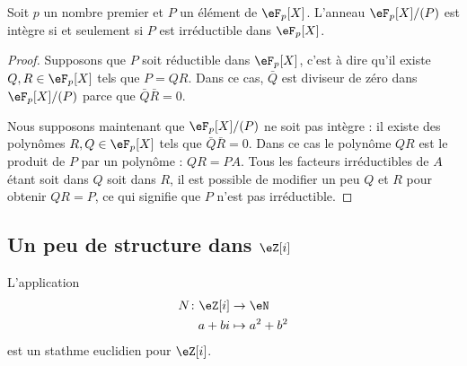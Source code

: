 \begin{proposition} \label{PropleGdaT}
    Soit \( p\) un nombre premier et \( P\) un élément de \( \eF_p[X]\). L'anneau \( \eF_p[X]/(P)\) est intègre si et seulement si \( P\) est irréductible dans \( \eF_p[X]\).
\end{proposition}

\begin{proof}
    Supposons que \( P\) soit réductible dans \( \eF_p[X]\), c'est à dire qu'il existe \( Q,R\in \eF_p[X]\) tels que \( P=QR\). Dans ce cas, \( \bar Q\) est diviseur de zéro dans \( \eF_p[X]/(P)\) parce que \( \bar Q\bar R=0\).

    Nous supposons maintenant que \( \eF_p[X]/(P)\) ne soit pas intègre : il existe des polynômes \( R,Q\in \eF_p[X]\) tels que \( \bar Q\bar R=0\). Dans ce cas le polynôme \( QR\) est le produit de \( P\) par un polynôme : \( QR=PA\). Tous les facteurs irréductibles de \( A \) étant soit dans \( Q\) soit dans \( R\), il est possible de modifier un peu \( Q\) et \( R\) pour obtenir \( QR=P\), ce qui signifie que \( P\) n'est pas irréductible.
\end{proof}

\subsection{Un peu de structure dans \texorpdfstring{$ \eZ[i]$}{Zi}}

\begin{lemma}   \label{LemSCAlICY}
     L'application
     \begin{equation}
         \begin{aligned}
             N\colon \eZ[i]&\to \eN \\
             a+bi&\mapsto a^2+b^2
         \end{aligned}
     \end{equation}
     est un stathme euclidien pour \( \eZ[i]\).
\end{lemma}

